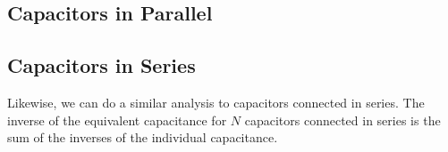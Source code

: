 \subsection{Capacitors in Parallel}
%
%  
%
%
%
%
%
\subsection{Capacitors in Series}
Likewise, we can do a similar analysis to capacitors connected in series.
%
%  
%
%
%
%
%
%
The inverse of the equivalent capacitance for $N$ capacitors connected in
series is the sum of the inverses of the individual capacitance.
%
%
%  


